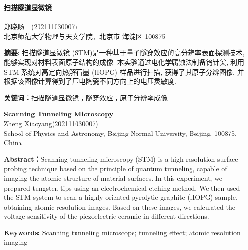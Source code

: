 \documentclass{whureport}
\newcommand{\name}{郑晓旸}
\newcommand{\stuid}{202111030007}
\newcommand{\Name}{Zheng Xiaoyang}
\newcommand{\newtitle}{扫描隧道显微镜}
\begin{document}
\pagestyle{maincontent} 


\begin{center}
 \textbf{\newtitle}\\
~\\
 \kaishu \name \ \ (\stuid)\\
 \kaishu 北京师范大学物理与天文学院，北京市 海淀区 100875\\
\end{center}

\textbf{摘\quad 要:}
扫描隧道显微镜 (STM)是一种基于量子隧穿效应的高分辨率表面探测技术, 能够实现对材料表面原子结构的成像. 本实验通过电化学腐蚀法制备钨针尖, 利用 STM 系统对高定向热解石墨 (HOPG) 样品进行扫描, 获得了其原子分辨图像, 并根据该图像计算得到了压电陶瓷不同方向上的电压灵敏度.

\textbf{关键词：}扫描隧道显微镜；隧穿效应；原子分辨率成像
~\\
\begin{center}
	 \textbf{Scanning Tunneling Microscopy}\\
	 \Name\quad (\stuid)\\
	 School of Physics and Astronomy, Beijing Normal University, Beijing, 100875, China
\end{center}

\textbf{Abstract：}Scanning tunneling microscopy (STM) is a high-resolution surface probing technique based on the principle of quantum tunneling, capable of imaging the atomic structure of material surfaces. In this experiment, we prepared tungsten tips using an electrochemical etching method.  We then used the STM system to scan a highly oriented pyrolytic graphite (HOPG) sample, obtaining atomic-resolution images.  Based on these images, we calculated the voltage sensitivity of the piezoelectric ceramic in different directions.

\textbf{Keywords: }Scanning tunneling microscope; tunneling effect; atomic resolution imaging
\end{document}
